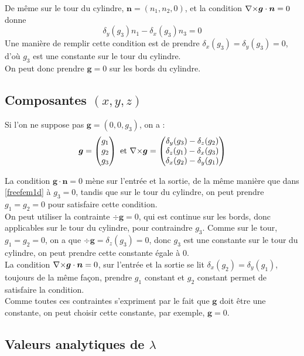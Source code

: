 De même sur le tour du cylindre, $\bm{n}=(n_1,n_2,0)$, et la condition ${\nabla\times}\bm{g}\cdot\bm{n}=0$ donne \[\delta_y(g_3)n_1-\delta_x(g_3)n_3=0\]
Une manière de remplir cette condition est de prendre $\delta_x(g_3)=\delta_y(g_3)=0$, d'où $g_3$ est une constante sur le tour du cylindre.\\
On peut donc prendre $\bm{g}=0$ sur les bords du cylindre.

\subsection{Composantes $(x,y,z)$}
Si l'on ne suppose pas $\bm{g}=(0,0,g_3)$, on a : 
\[
\bm{g}=
\begin{pmatrix}
g_1\\
g_2\\
g_3
\end{pmatrix}
\text{ et }
{\nabla\times}\bm{g}=
\begin{pmatrix}
\delta_y(g_3)-\delta_z(g_2)\\
\delta_z(g_1)-\delta_x(g_3)\\
\delta_x(g_2)-\delta_y(g_1)
\end{pmatrix}
\]

La condition $\bm{g}\cdot\bm{n}=0$ mène sur l'entrée et la sortie, de la même manière que dans \ref{freefem1d} à $g_3=0$, tandis que sur le tour du cylindre, on peut prendre $g_1=g_2=0$ pour satisfaire cette condition.\\

On peut utiliser la contrainte $\div\bm{g}=0$, qui est continue sur les bords, donc applicables sur le tour du cylindre, pour contraindre $g_3$. Comme sur le tour, $g_1=g_2=0$, on a que $\div\bm{g}=\delta_z(g_3)=0$, donc $g_3$ est une constante sur le tour du cylindre, on peut prendre cette constante égale à 0.\\

La condition ${\nabla\times}\bm{g}\cdot\bm{n}=0$, sur l'entrée et la sortie se lit $\delta_x(g_2)=\delta_y(g_1)$, toujours de la même façon, prendre $g_1$ constant et $g_2$ constant permet de satisfaire la condition.\\

Comme toutes ces contraintes s'expriment par le fait que $\bm{g}$ doit être une constante, on peut choisir cette constante, par exemple, $\bm{g}=0$.

\subsection{Valeurs analytiques de $\lambda$}

